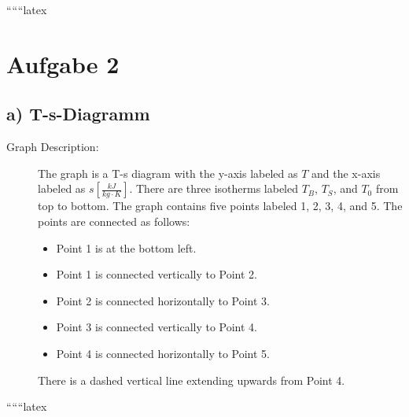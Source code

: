 
``````latex


\section*{Aufgabe 2}

\subsection*{a) T-s-Diagramm}

\begin{description}
    \item[Graph Description:] The graph is a T-s diagram with the y-axis labeled as \( T \) and the x-axis labeled as \( s \left[ \frac{kJ}{kg \cdot K} \right] \). There are three isotherms labeled \( T_B \), \( T_S \), and \( T_0 \) from top to bottom. The graph contains five points labeled 1, 2, 3, 4, and 5. The points are connected as follows:
    \begin{itemize}
        \item Point 1 is at the bottom left.
        \item Point 1 is connected vertically to Point 2.
        \item Point 2 is connected horizontally to Point 3.
        \item Point 3 is connected vertically to Point 4.
        \item Point 4 is connected horizontally to Point 5.
    \end{itemize}
    There is a dashed vertical line extending upwards from Point 4.
\end{description}

``````latex


